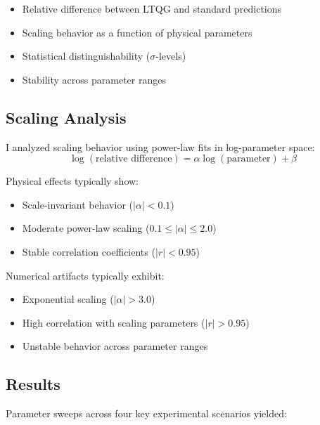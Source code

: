 \documentclass[12pt,a4paper]{article}
\begin{document}
\begin{itemize}
\item Relative difference between LTQG and standard predictions
\item Scaling behavior as a function of physical parameters
\item Statistical distinguishability ($\sigma$-levels)
\item Stability across parameter ranges
\end{itemize}

\subsection{Scaling Analysis}

I analyzed scaling behavior using power-law fits in log-parameter space:
\begin{equation}
\log(\text{relative difference}) = \alpha \log(\text{parameter}) + \beta
\end{equation}

Physical effects typically show:
\begin{itemize}
\item Scale-invariant behavior ($|\alpha| < 0.1$)
\item Moderate power-law scaling ($0.1 \leq |\alpha| \leq 2.0$)
\item Stable correlation coefficients ($|r| < 0.95$)
\end{itemize}

Numerical artifacts typically exhibit:
\begin{itemize}
\item Exponential scaling ($|\alpha| > 3.0$)
\item High correlation with scaling parameters ($|r| > 0.95$)
\item Unstable behavior across parameter ranges
\end{itemize}

\subsection{Results}

Parameter sweeps across four key experimental scenarios yielded:
\end{document}
